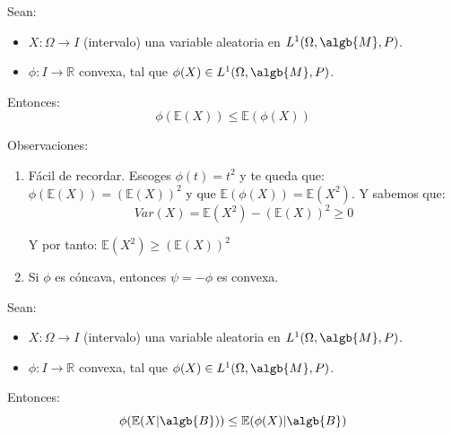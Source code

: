 \documentclass{apuntes}
\begin{document}
\begin{defn}
Sean:
\begin{itemize}
\item $X: \Omega \rightarrow I$ (intervalo) una variable aleatoria en $L^1(\Omega, \algb{M},P)$.
\item $\phi: I \rightarrow \mathbb{R}$ convexa, tal que $\phi(X) \in L^1(\Omega,\algb{M},P)$.
\end{itemize}
Entonces:
\[
\phi(\mathbb{E}(X)) \leq \mathbb{E}(\phi(X))
\]

Observaciones:
\begin{enumerate}
\item Fácil de recordar. Escoges $\phi(t)=t^2$ y te queda que: $\phi(\mathbb{E}(X))=(\mathbb{E}(X))^2$ y que  $\mathbb{E}(\phi(X)) = \mathbb{E}(X^2)$. Y sabemos que:
\[
Var(X) = \mathbb{E}(X^2) - (\mathbb{E}(X))^2 \geq 0
\]

Y por tanto: $\mathbb{E}(X^2) \geq (\mathbb{E}(X))^2$
\item Si $\phi$ es cóncava, entonces $\psi = -\phi$ es convexa.
\end{enumerate}
\end{defn}

\begin{defn}
Sean:
\begin{itemize}
\item $X: \Omega \rightarrow I$ (intervalo) una variable aleatoria en $L^1(\Omega, \algb{M},P)$.
\item $\phi: I \rightarrow \mathbb{R}$ convexa, tal que $\phi(X) \in L^1(\Omega,\algb{M},P)$.
\end{itemize}
Entonces:
\[
\phi(\mathbb{E}(X|\algb{B})) \leq \mathbb{E}(\phi(X)|\algb{B})
\]
\end{defn}
\end{document}
